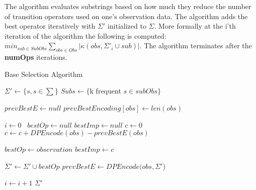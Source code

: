 The algorithm evaluates substrings based on how much they reduce the number of transition operators used on one's observation data. The algorithm adds the best operator iteratively with $\Sigma'$ initialized to $\Sigma$. More formally at the i'th iteration of the algorithm the following is computed: $min_{sub \in SubObs} \sum\nolimits_{obs \in Obs}|\kappa(obs,\Sigma'_i \cup sub)|$. The algorithm terminates after the \textbf{numOps} iterations. 

\begin{algorithm}
\caption{Base Selection Algorithm}
\label{Base Selection}
\begin{algorithmic}[1]
\State $\Sigma' \gets \{s, s \in \sum \}$
\State $Subs \gets \{$k frequent $s \in subObs\}$

\State $prevBestE \gets null$
	\State $prevBestEncoding[obs] \gets len(obs)$
\EndFor

\State $i\gets 0$\
	\State $bestOp \gets null$
	\State $bestImp \gets null$
		\State $c \gets 0$
			\State $c \gets c+DPEncode(obs)-prevBestE(obs)$
		\EndFor
		
			\State $bestOp \gets observation$
			\State $bestImp \gets c$
		\EndIf
		
	\EndFor

	\State $\Sigma' \gets \Sigma' \cup bestOp$
		\State $prevBestE \gets DPEncode(obs,\Sigma'$) 
	\EndFor	
	
	\State $i \gets i + 1$
\EndWhile 
\Return $\Sigma'$

\EndProcedure
\end{algorithmic}
\end{algorithm}


